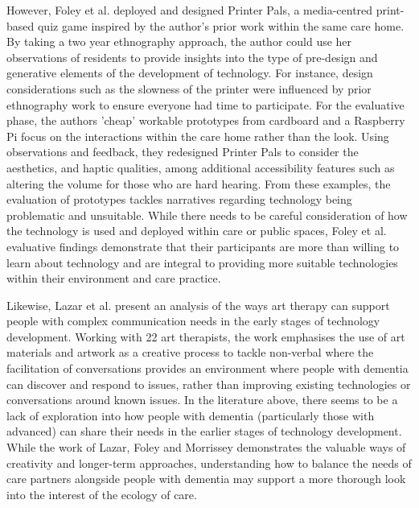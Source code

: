However, Foley et al. deployed and designed Printer Pals, a media-centred print-based quiz game inspired by the author's prior work within the same care home. By taking a two year ethnography approach, the author could use her observations of residents to provide insights into the type of pre-design and generative elements of the development of technology. For instance, design considerations such as the slowness of the printer were influenced by prior ethnography work to ensure everyone had time to participate. For the evaluative phase, the authors 'cheap' workable prototypes from cardboard and a Raspberry Pi focus on the interactions within the care home rather than the look. Using observations and feedback, they redesigned Printer Pals to consider the aesthetics, and haptic qualities, among additional accessibility features such as altering the volume for those who are hard hearing. From these examples, the evaluation of prototypes tackles narratives regarding technology being problematic and unsuitable. While there needs to be careful consideration of how the technology is used and deployed within care or public spaces, Foley et al. evaluative findings demonstrate that their participants are more than willing to learn about technology and are integral to providing more suitable technologies within their environment and care practice.

Likewise, Lazar et al. present an analysis of the ways art therapy can support people with complex communication needs in the early stages of technology development. Working with 22 art therapists, the work emphasises the use of art materials and artwork as a creative process to tackle non-verbal where the facilitation of conversations provides an environment where people with dementia can discover and respond to issues, rather than improving existing technologies or conversations around known issues. In the literature above, there seems to be a lack of exploration into how people with dementia (particularly those with advanced) can share their needs in the earlier stages of technology development. While the work of Lazar, Foley and Morrissey demonstrates the valuable ways of creativity and longer-term approaches, understanding how to balance the needs of care partners alongside people with dementia may support a more thorough look into the interest of the ecology of care.

